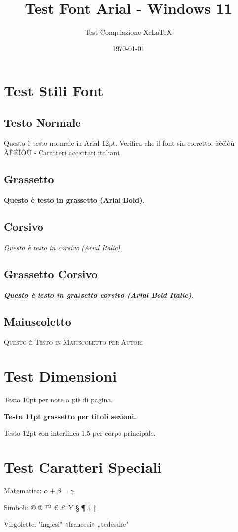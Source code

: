 \documentclass{article}
\begin{document}
\title{Test Font Arial - Windows 11}
\author{Test Compilazione XeLaTeX}
\date{\today}
\maketitle

\section{Test Stili Font}

\subsection{Testo Normale}
Questo è testo normale in Arial 12pt. Verifica che il font sia corretto.
àèéìòù ÀÈÉÌÒÙ - Caratteri accentati italiani.

\subsection{Grassetto}
\textbf{Questo è testo in grassetto (Arial Bold).}

\subsection{Corsivo}
\textit{Questo è testo in corsivo (Arial Italic).}

\subsection{Grassetto Corsivo}
\textbf{\textit{Questo è testo in grassetto corsivo (Arial Bold Italic).}}

\subsection{Maiuscoletto}
\textsc{Questo è Testo in Maiuscoletto per Autori}

\section{Test Dimensioni}

{\fontsize{10}{12}\selectfont Testo 10pt per note a piè di pagina.}

{\fontsize{11}{13}\selectfont\bfseries Testo 11pt grassetto per titoli sezioni.}

{\fontsize{12}{18}\selectfont Testo 12pt con interlinea 1.5 per corpo principale.}

\section{Test Caratteri Speciali}

Matematica: $\alpha + \beta = \gamma$

Simboli: © ® ™ € £ ¥ § ¶ † ‡

Virgolette: "inglesi" «francesi» „tedesche"
\end{document}
